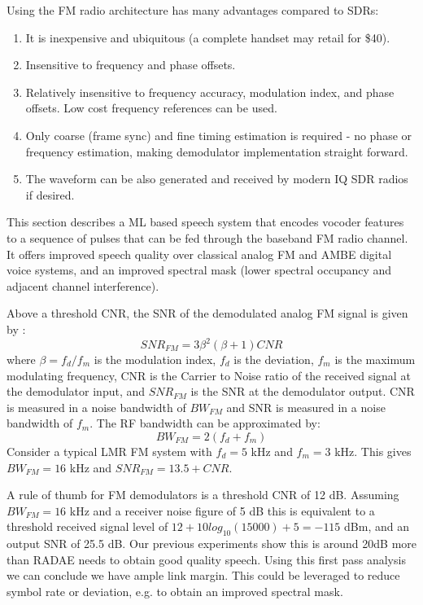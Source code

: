 \documentclass{article}
\begin{document}
Using the FM radio architecture has many advantages compared to SDRs:
\begin{enumerate}
\item It is inexpensive and ubiquitous (a complete handset may retail for \$40).
\item Insensitive to frequency and phase offsets.
\item Relatively insensitive to frequency accuracy, modulation index, and phase offsets. Low cost frequency references can be used.
\item Only coarse (frame sync) and fine timing estimation is required - no phase or frequency estimation, making demodulator implementation straight forward.
\item The waveform can be also generated and received by modern IQ SDR radios if desired.
\end{enumerate}

This section describes a ML based speech system that encodes vocoder features to a sequence of pulses that can be fed through the baseband FM radio channel.  It offers improved speech quality over classical analog FM and AMBE digital voice systems, and an improved spectral mask (lower spectral occupancy and adjacent channel interference). 

Above a threshold CNR, the SNR of the demodulated analog FM signal is given by \cite{der_fmtutorial}:
\begin{equation}
SNR_{FM} = 3\beta^2(\beta+1) CNR
\end{equation}
where $\beta=f_d / f_m$ is the modulation index, $f_d$ is the deviation, $f_m$ is the maximum modulating frequency, CNR is the Carrier to Noise ratio of the received signal at the demodulator input, and $SNR_{FM}$ is the SNR at the demodulator output. CNR is measured in a noise bandwidth of $BW_{FM}$ and SNR is measured in a noise bandwidth of $f_m$.  The RF bandwidth can be approximated by:
\begin{equation}
BW_{FM} = 2(f_d+f_m)
\end{equation}
Consider a typical LMR FM system with $f_d=5$ kHz and $f_m=3$ kHz.  This gives $BW_{FM}=16$ kHz and $SNR_{FM}=13.5+CNR$.

A rule of thumb for FM demodulators is a threshold CNR of 12 dB. Assuming $BW_{FM}=16$ kHz and a receiver noise figure of 5 dB this is equivalent to a threshold received signal level of $12 + 10log_{10}(15000) + 5  = -115$ dBm, and an output SNR of 25.5 dB. Our previous experiments show this is around 20dB more than RADAE needs to obtain good quality speech.  Using this first pass analysis we can conclude we have ample link margin.  This could be leveraged to reduce symbol rate or deviation, e.g. to obtain an improved spectral mask.
\end{document}
